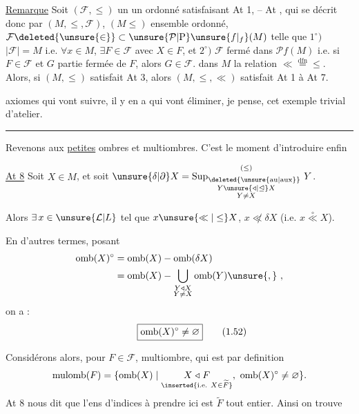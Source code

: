 \uline{Remarque} Soit $(\mathcal F,\leq)$ un un ordonné satisfaisant At 1, -- At ,  qui se décrit donc par $(M,\leq,\mathcal F)$,  $(M\leq)$ ensemble ordonné, $\mathcal F\deleted{\unsure{\in}}\subset\unsure{\mathcal P|\mathrm P}\unsure{f|{}_{f}}(M)$  telle que $1^\circ)$ $\lvert\mathcal F\rvert=M$ i.e. $\forall x\in M$, $\exists F\in\mathcal F$ avec $X\in F$, et $2^\circ)$ $\mathcal F$ fermé dans $\mathcal P f(M)$ i.e. si $F\in\mathcal F$ et $G$ partie fermée de $F$, alors $G\in\mathcal F$.  dans $M$ la relation $\ll\mathrel{\overset{\mathrm{dfn}}{=}}\leq$. Alors, si $(M,\leq)$ satisfait At 3, alors $(M,\leq,\ll)$ satisfait At 1 à At 7. 

axiomes qui vont suivre, il y en a qui vont éliminer, je pense, cet exemple trivial d'atelier.

\par\noindent\hfill\rule{1.4cm}{.3pt}\hfill\mbox{}\par

Revenons aux \uline{petites} ombres et multiombres. C'est le moment d'introduire enfin

\uline{At 8} Soit $X\in M$, et soit $\unsure{\delta|\partial} X=\mathop{\mathrm{Sup}_{\deleted{\unsure{\mathrm{au}|\mathrm{aux}}}}}\limits_{\substack{Y\mathrel{\unsure{\triangleleft|\trianglelefteq}}X\\Y\ne X}}^{(\leq)}\,Y$.

Alors $\exists\,x\in\unsure{\mathcal L|L}$ tel que $x\unsure{\ll|\leq}X$,  $x\mathrel{\not\ll}\delta X$  (i.e. $x\mathrel{\overset{\circ}{\ll}}X$).  

En d'autres termes, posant 
\[
\begin{aligned}
\mathrm{omb}(X)^\circ&=\mathrm{omb}(X)-\mathrm{omb}(\delta X)\\
&=\mathrm{omb}(X)-\bigcup_{\substack{Y\mathrel{\triangleleft} X\\Y\ne X}}\mathrm{omb}(Y)\unsure{,}\ ,
\end{aligned}
\]
on a :
\[
\boxed{\mathrm{omb}(X)^\circ\ne\varnothing}
\tag*{\makebox[0pt][r]{\makebox[\displaywidth][l]{(1.52)}}}
\]

Considérons alors, pour $F\in\mathcal F$,  multiombre, qui est par definition  
\[
\mathrm{mulomb}(F)=\{\mathrm{omb}(X)\mid\underset{\inserted{\text{i.e. }X\in\widetilde F}}{X\mathrel{\triangleleft} F},\ \mathrm{omb}(X)^\circ\ne\varnothing\}.
\]
At 8 nous dit que l'ens d'indices à prendre ici est $\widetilde F$ tout entier. Ainsi on trouve 

